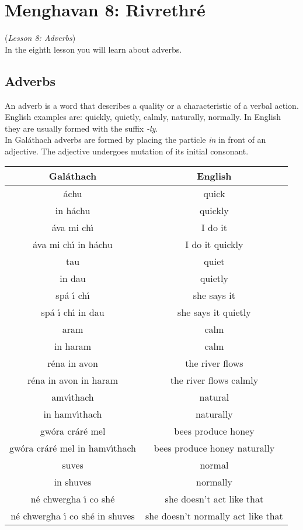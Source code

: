 \section{Menghavan 8: Rivrethr\'{e}}
(\textit{Lesson 8: Adverbs})\\

In the eighth lesson you will learn about adverbs.

\subsection{Adverbs}

An adverb is a word that describes a quality or a characteristic of a verbal action.\\
English examples are: quickly, quietly, calmly, naturally, normally. In English they are usually formed with the suffix \textit{-ly}.\\
In Gal\'{a}thach adverbs are formed by placing the particle \textit{in} in front of an adjective. The adjective undergoes mutation of its initial consonant.
\begin{table}[H]
\centering
\begin{tabular}{c|c}
  \textbf{Gal\'{a}thach} & \textbf{English}\\
  \toprule
  \'{a}chu & quick\\
  in h\'{a}chu & quickly\\
  \'{a}va mi ch\'{\i} & I do it\\
  \'{a}va mi ch\'{\i} in h\'{a}chu & I do it quickly\\
  \midrule
  tau & quiet\\
  in dau & quietly\\
  sp\'{a} \'{\i} ch\'{\i} & she says it\\
  sp\'{a} \'{\i} ch\'{\i} in dau & she says it quietly\\
  \midrule
  aram & calm\\
  in haram & calm\\
  r\'{e}na in avon & the river flows\\
  r\'{e}na in avon in haram & the river flows calmly\\
  \midrule
  amv\'{\i}thach & natural\\
  in hamv\'{\i}thach & naturally\\
  gw\'{o}ra cr\'{a}r\'{e} mel & bees produce honey\\
  gw\'{o}ra cr\'{a}r\'{e} mel in hamv\'{\i}thach & bees produce honey naturally\\
  \midrule
  suves & normal\\
  in shuves & normally\\
  n\'{e} chwergha \'{\i} co sh\'{e} & she doesn't act like that\\
  n\'{e} chwergha \'{\i} co sh\'{e} in shuves & she doesn't normally act like that
\end{tabular}
\label{examples_adverb}
\end{table}


